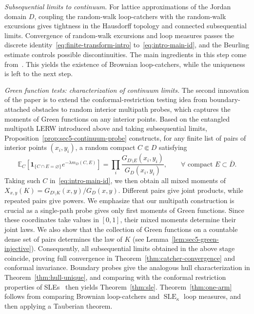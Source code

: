 \documentclass[11pt]{article}
\numberwithin{equation}{section}
\newcommand{\E}{\mathbb{E}}
\newcommand{\1}{\mathbf{1}}
\DeclareMathOperator{\SLE}{SLE}
\newcommand\ol[1]{\overline{#1}}
\newcommand{\one}{\mathbf 1}
\begin{document}
\medskip
\noindent\emph{Subsequential limits to continuum.}
For lattice approximations of the Jordan domain $D$, coupling the random-walk loop-catchers with the
random-walk excursions gives tightness in the Hausdorff topology and connected
subsequential limits. Convergence of random-walk excursions and loop measures passes the discrete identity~\eqref{eq:finite-transform-intro} to~\eqref{eq:intro-main-id}, and the Beurling estimate controls possible discontinuities. The main ingredients in this step come from~\cite{KozdronLawler2005,LawlerTrujillo2007,LawlerLimic2010}. This yields the existence of Brownian loop-catchers, while the uniqueness is left to the next step.


\medskip
\noindent\emph{Green function tests: characterization of continuum limits.}
The second innovation of the paper is to extend the
conformal-restriction testing idea from boundary-attached obstacles to
random interior multipath probes, which captures the moments of Green functions on any interior points. Based on the entangled multipath LERW introduced above and taking subsequential limits, Proposition~\ref{prop:sec5-continuum-probe} constructs, for any finite list of pairs of interior points $(x_i,y_i)$, a random compact \(C\Subset D\) satisfying
\[
 \E_C\!\left[\one_{\{C\cap E=\varnothing\}}e^{-\lambda m_D(C,E)}\right]
 =\prod_i\frac{G_{D\setminus E}(x_i,y_i)}{G_D(x_i,y_i)},\qquad \forall \text{ compact } E\subset\ol D.
\]
Taking such $C$ in~\eqref{eq:intro-main-id}, we then obtain all mixed moments of
\(X_{x,y}(K)=G_{D\setminus K}(x,y)/G_D(x,y)\).  Different pairs give joint products, while repeated pairs give powers.
We emphasize that our multipath construction is crucial as a single-path probe gives only first moments of Green functions.
Since these coordinates take values in \([0,1]\), their mixed moments
determine their joint laws.
We also show that the collection of Green functions on a countable dense set of
pairs determines the law of $K$ (see Lemma~\ref{lem:sec5-green-injective}). Consequently, all subsequential
limits obtained in the above stage coincide, proving full convergence in
Theorem~\ref{thm:catcher-convergence} and conformal invariance. Boundary probes give the analogous hull characterization in Theorem~\ref{thm:hull-unique}, and comparing with the conformal restriction properties of SLEs~\cite{dubedat-rho,qian2021generalized} then yields Theorem~\ref{thm:sle}. Theorem~\ref{thm:one-arm} follows from comparing Brownian loop-catchers and $\SLE_\kappa$ loop measures, and then applying a Tauberian theorem.
\end{document}

